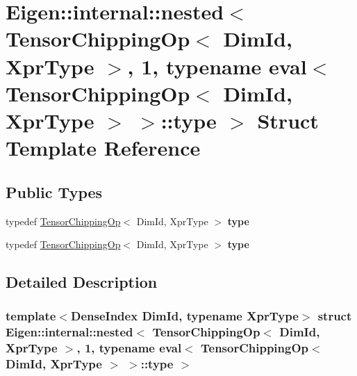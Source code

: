 \hypertarget{struct_eigen_1_1internal_1_1nested_3_01_tensor_chipping_op_3_01_dim_id_00_01_xpr_type_01_4_00_013fc4e0c26ee0dd525012de858ae0206f}{}\section{Eigen\+:\+:internal\+:\+:nested$<$ Tensor\+Chipping\+Op$<$ Dim\+Id, Xpr\+Type $>$, 1, typename eval$<$ Tensor\+Chipping\+Op$<$ Dim\+Id, Xpr\+Type $>$ $>$\+:\+:type $>$ Struct Template Reference}
\label{struct_eigen_1_1internal_1_1nested_3_01_tensor_chipping_op_3_01_dim_id_00_01_xpr_type_01_4_00_013fc4e0c26ee0dd525012de858ae0206f}
\subsection*{Public Types}
\begin{DoxyCompactItemize}
\item 
\mbox{\label{struct_eigen_1_1internal_1_1nested_3_01_tensor_chipping_op_3_01_dim_id_00_01_xpr_type_01_4_00_013fc4e0c26ee0dd525012de858ae0206f_aa2c3e00a6b112b0784ebd0166118687d}} 
typedef \hyperlink{class_eigen_1_1_tensor_chipping_op}{Tensor\+Chipping\+Op}$<$ Dim\+Id, Xpr\+Type $>$ {\bfseries type}
\item 
\mbox{\label{struct_eigen_1_1internal_1_1nested_3_01_tensor_chipping_op_3_01_dim_id_00_01_xpr_type_01_4_00_013fc4e0c26ee0dd525012de858ae0206f_aa2c3e00a6b112b0784ebd0166118687d}} 
typedef \hyperlink{class_eigen_1_1_tensor_chipping_op}{Tensor\+Chipping\+Op}$<$ Dim\+Id, Xpr\+Type $>$ {\bfseries type}
\end{DoxyCompactItemize}


\subsection{Detailed Description}
\subsubsection*{template$<$Dense\+Index Dim\+Id, typename Xpr\+Type$>$\newline
struct Eigen\+::internal\+::nested$<$ Tensor\+Chipping\+Op$<$ Dim\+Id, Xpr\+Type $>$, 1, typename eval$<$ Tensor\+Chipping\+Op$<$ Dim\+Id, Xpr\+Type $>$ $>$\+::type $>$}



